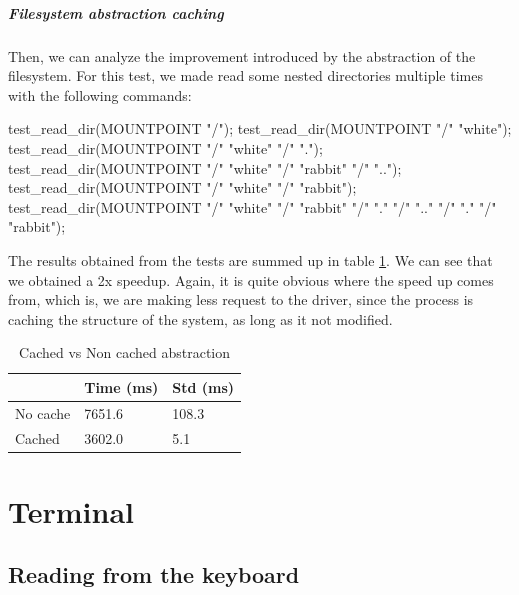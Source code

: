 \documentclass[a4paper,twoside,openright]{report}
\begin{document}
\paragraph{Filesystem abstraction caching}
Then, we can analyze the improvement introduced by the abstraction of the filesystem.
For this test, we made read some nested directories multiple times with the following commands:
\begin{pandacode}
test_read_dir(MOUNTPOINT "/");
test_read_dir(MOUNTPOINT "/" "white");
test_read_dir(MOUNTPOINT "/" "white" "/"  ".");
test_read_dir(MOUNTPOINT "/" "white" "/" "rabbit" "/" "..");
test_read_dir(MOUNTPOINT "/" "white" "/" "rabbit");
test_read_dir(MOUNTPOINT "/" "white" "/" "rabbit" "/" "."
                                    "/" ".." "/" "." "/" "rabbit");
\end{pandacode} 
The results obtained from the tests are summed up in table \ref{tab:cached_abs}. We can see that we obtained a 2x speedup.
Again, it is quite obvious where the speed up comes from, which is, we are making less request to the driver, since the process is caching the
structure of the system, as long as it not modified.
\begin{table}[H]
\centering
\begin{tabular}{@{}lll@{}}
\toprule
         & Time (ms) & Std (ms) \\ \midrule
No cache & 7651.6    & 108.3    \\
Cached   & 3602.0    & 5.1      \\ \bottomrule
\end{tabular}
\caption{Cached vs Non cached abstraction}
\label{tab:cached_abs}
\end{table}




\chapter{Terminal} \label{cap:term}

\section{Reading from the keyboard}
\end{document}
